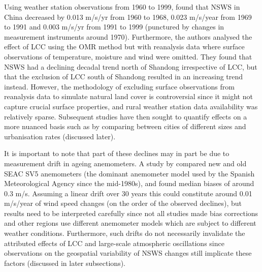 Using weather station observations from 1960 to 1999, \citet{li2008} found that \ac{NSWS} in China decreased by 0.013 m/s/yr from 1960 to 1968, 0.023 m/s/year from 1969 to 1991 and 0.003 m/s/yr from 1991 to 1999 (punctured by changes in measurement instruments around 1970). Furthermore, the authors analysed the effect of \ac{LCC} using the \ac{OMR} method but with reanalysis data where surface observations of temperature, moisture and wind were omitted. They found that \ac{NSWS} had a declining decadal trend north of Shandong irrespective of \ac{LCC}, but that the exclusion of \ac{LCC} south of Shandong resulted in an increasing trend instead. However, the methodology of excluding surface observations from reanalysis data to simulate natural land cover is controversial since it might not capture crucial surface properties, and rural weather station data availability was relatively sparse. Subsequent studies have then sought to quantify effects on a more nuanced basis such as by comparing between cities of different sizes and urbanisation rates (discussed later).

It is important to note that part of these declines may in part be due to measurement drift in ageing anemometers. A study by \citet{azorin-molina2018_drift} compared new and old SEAC SV5 anemometers (the dominant anemometer model used by the Spanish Meteorological Agency since the mid-1980s), and found median biases of around 0.3 m/s. Assuming a linear drift over 30 years this could constitute around 0.01 m/s/year of wind speed changes (on the order of the observed declines), but results need to be interpreted carefully since not all studies made bias corrections and other regions use different anemometer models which are subject to different weather conditions. Furthermore, such drifts do not necessarily invalidate the attributed effects of \ac{LCC} and large-scale atmospheric oscillations since observations on the geospatial variability of \ac{NSWS} changes still implicate these factors (discussed in later subsections).

